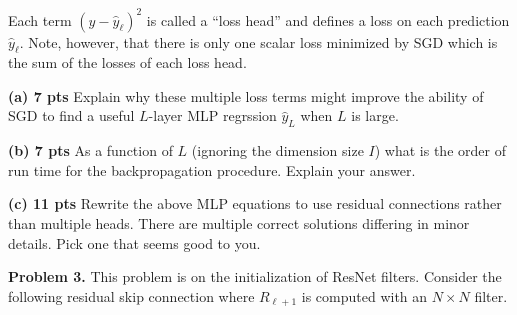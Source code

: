 \documentclass{article}
\newcommand{\solution}[1]{}
\begin{document}
Each term $(y-\hat{y}_\ell)^2$ is called a ``loss head'' and defines a loss on each prediction $\hat{y}_{\ell}$.
Note, however, that there is only one scalar loss minimized by SGD which is the sum of the losses of each loss head.

\medskip
{\bf (a) 7 pts} Explain why these multiple loss terms might improve the ability of SGD to find a useful $L$-layer MLP regrssion $\hat{y}_L$ when $L$ is large.

\solution{
  SGD on deep networks with the loss term only occuring at the final layer is not generally effective because the lower layers
  never get meaninful gradients.  Placing loss functions near the lower layers will cause the lower hidden layers to have meaningful
  gradients and produce informative features.
}

\medskip
{\bf (b) 7 pts} As a function of $L$ (ignoring the dimension size $I$) what is the order of run time for the backpropagation procedure.
Explain your answer.

\solution{It is $O(L)$ --- linear in $L$.  Backpropagation loops over the assignments of the program and takes time proportional to the size of the program.
  Back-propagation over the final sum of losses produces a gradient for each prediction $\hat{y}_\ell$ which can be used as we back-propagate over the
  earlier assignments.
}

\medskip
{\bf (c) 11 pts} Rewrite the above MLP equations to use residual connections rather than multiple heads.  There are multiple correct solutions differing in minor details.  Pick one that seems
good to you.

\solution{
\begin{eqnarray*}
  h_0[i] & = & x[i] \\
  & \vdots & \\
  \tilde{h}_{\ell+1}[i] & = & \sigma(W^{h,h}_{\ell+1}[i,I]h_\ell[I] - B^{h,h}_{\ell+1}[i]) \\
  h_{\ell+1}[i] & = & \tilde{h}_{\ell+1}[i] + h_\ell[i] \\
  & \vdots & \\
  \hat{y} & = & W^{h,y}[I]h_L[I]- B^{h,y} \\
  \mathrm{Loss} & = & (y - \hat{y})^2
\end{eqnarray*}
}



\bigskip
{\bf Problem 3.} This problem is on the initialization of ResNet filters.
Consider the following residual skip connection where $R_{\ell+1}$ is computed with an $N \times N$ filter.
\end{document}
